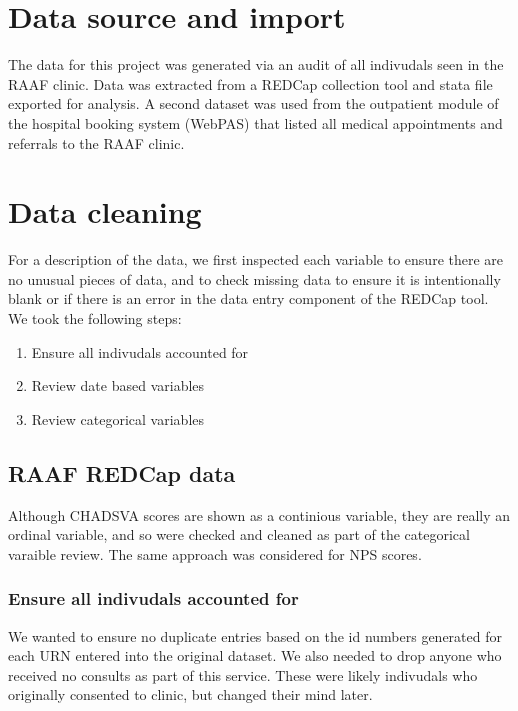 \documentclass[11pt]{article}
\begin{document}
\pagebreak
\section{Data source and import}
The data for this project was generated via an audit of all indivudals seen in the RAAF clinic. Data was extracted from a REDCap collection tool and stata file exported for analysis. \cite{redcap1,redcap2} A second dataset was used from the outpatient module of the hospital booking system (WebPAS) that listed all medical appointments and referrals to the RAAF clinic. 
\color{violet}
\begin{stlog}\end{stlog}
\color{black}
\section{Data cleaning}

For a description of the data, we first inspected each variable to ensure there are no unusual pieces of data, and to check missing data to ensure it is intentionally blank or if there is an error in the data entry component of the REDCap tool. We took the following steps:
\begin{enumerate}
	\item Ensure all indivudals accounted for
	\item Review date based variables
	\item Review categorical variables
\end{enumerate}

\subsection{RAAF REDCap data}
Although CHADSVA scores are shown as a continious variable, they are really an ordinal variable, and so were checked and cleaned as part of the categorical varaible review. The same approach was considered for NPS scores.
\color{violet}
\begin{stlog}\end{stlog}
\color{black}
\subsubsection{Ensure all indivudals accounted for}
We wanted to ensure no duplicate entries based on the id numbers generated for each URN entered into the original dataset. We also needed to drop anyone who received no consults as part of this service. These were likely indivudals who originally consented to clinic, but changed their mind later. 
\color{violet}
\begin{stlog}\end{stlog}
\color{black}
\end{document}
